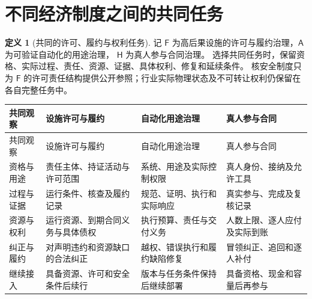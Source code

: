 \documentclass[UTF8,12pt,a4paper,openany,fontset=none,zihao=false]{ctexrep}
\theoremstyle{definition}
\newtheorem{definition}{定义}[chapter]
\newcommand{\1}{\mathbf 1}
\begin{document}
\section{不同经济制度之间的共同任务}
\begin{definition}[共同的许可、履约与权利任务]
\label{q:three-institutions}
记 \(\mathsf F\) 为高后果设施的许可与履约治理，\(\mathsf A\) 为可验证自动化的用途治理，
\(\mathsf H\) 为真人参与合同治理。
选择共同任务时，保留资格、实际过程、责任、资源、证据、具体权利、修复和延续条件。
核安全制度只为 \(\mathsf F\) 的许可责任结构提供公开参照；行业实际物理状态及不可转让权利仍保留在各自完整任务中。
\end{definition}

\begingroup
\small
\renewcommand{\arraystretch}{1.16}
\begin{longtable}{p{}p{}p{}p{}}
\toprule
共同观察 & 设施许可与履约 & 自动化用途治理 & 真人参与合同\\
\midrule
\endfirsthead
\toprule
共同观察 & 设施许可与履约 & 自动化用途治理 & 真人参与合同\\
\midrule
\endhead
资格与用途 & 责任主体、持证活动与许可范围 & 系统、用途及实际控制权限 & 真人身份、接纳及允许工具\\
过程与证据 & 运行条件、核查及履约记录 & 规范、证明、执行和实际响应 & 真实参与、完成及复核记录\\
资源与权利 & 运行资源、到期合同义务与具体债权 & 执行预算、责任与交付义务 & 人数上限、逐人应付及实际到账\\
纠正与履约 & 对声明违约和资源缺口的合法纠正 & 越权、错误执行和履约缺陷修复 & 冒领纠正、追回和逐人补付\\
继续接入 & 具备资源、许可和安全条件后续行 & 版本与任务条件保持后继续部署 & 具备资格、现金和容量后再参与\\
\bottomrule
\end{longtable}
\endgroup
\end{document}
